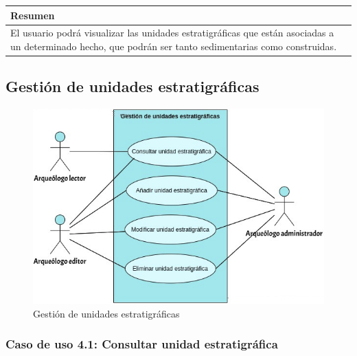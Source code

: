     \begin{table}[H]
        \centering
        \begin{tabularx}{\textwidth}{@{} |L |@{}} \hline
            \textbf{Resumen} \\
            \hline
            El usuario podrá visualizar las unidades estratigráficas que están asociadas
            a un determinado hecho, que podrán ser tanto sedimentarias como construidas. \\
            \hline
        \end{tabularx}
    \end{table}


\subsection{Gestión de unidades estratigráficas}
    \begin{figure}[H]
        \centering
        \includegraphics[scale=0.50]{imagenes/diagramas CU/UE-UC.png}
        \caption{Gestión de unidades estratigráficas}
        \label{fig:ue-management}
    \end{figure}

\subsubsection{Caso de uso 4.1: Consultar unidad estratigráfica}

